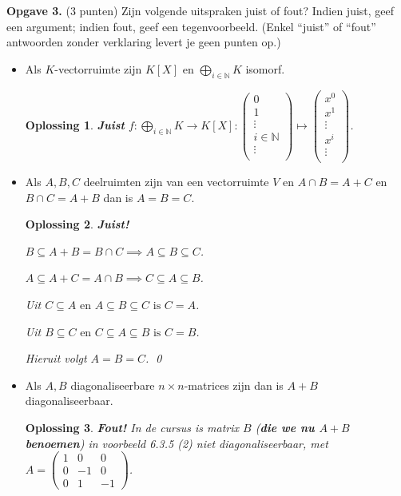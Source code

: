 \documentclass[a4paper,12pt]{article}
\newtheorem{oplossing}{Oplossing}
\begin{document}
\begin{enumerate}
\textbf{Opgave 3.} (3 punten) Zijn volgende uitspraken juist of fout? Indien juist, geef een argument; indien fout, geef een tegenvoorbeeld. (Enkel ``juist'' of ``fout'' antwoorden zonder verklaring levert je geen punten op.)
\begin{itemize}
    \item[(i)] Als $K$-vectorruimte zijn $K[X]$ en $\bigoplus_{i\in\mathbb{N}}K$ isomorf.
    \begin{oplossing}
        \textbf{Juist} \(f: \bigoplus_{i\in\mathbb{N}}K \to K[X]:  \begin{pmatrix}
            0\\
            1\\
            \vdots \\
            i \in \mathbb{N} \\
            \vdots \\
        \end{pmatrix} \mapsto
        \begin{pmatrix}
            x^{0}\\
            x^{1} \\
            \vdots \\
            x^{i} \\
            \vdots \\
        \end{pmatrix}
        \).
    \end{oplossing}
    \item[(ii)] Als $A, B, C$ deelruimten zijn van een vectorruimte $V$ en $A \cap B = A + C$ en $B \cap C = A + B$ dan is $A = B = C$.
    \begin{oplossing}
        \textbf{Juist!}

        \(B \subseteq A + B = B \cap C \implies A \subseteq B \subseteq C\).

        \(A \subseteq A + C = A \cap B \implies C \subseteq A \subseteq B\).

        Uit \(C \subseteq A \text{ en } A \subseteq B \subseteq C \text{ is } C = A \).

        Uit \( B \subseteq C \text{ en } C \subseteq A \subseteq B \text{ is } C = B\).

        Hieruit volgt $A = B = C$. \qed
    \end{oplossing}
    \item[(iii)] Als $A, B$ diagonaliseerbare $n \times n$-matrices zijn dan is $A+B$ diagonaliseerbaar.
    \begin{oplossing}
        \textbf{Fout!}
        In de cursus is matrix \(B\) (\textbf{die we nu \(A+B\) benoemen}) in voorbeeld 6.3.5 (2) niet diagonaliseerbaar, met
        \(A  = \begin{pmatrix}
            1 & 0 & 0 \\
            0 & -1 & 0\\
            0 & 1 & -1
        \end{pmatrix}\).


\end{oplossing}
\end{itemize}
\end{enumerate}
\end{document}
